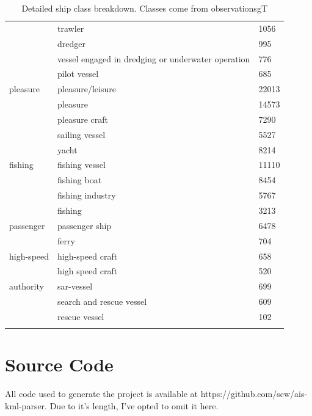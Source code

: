 \begin{longtable}{l|l|l}
          & trawler & 1056 \\
          & dredger & 995 \\
          & vessel engaged in dredging or underwater operation & 776 \\
          & pilot vessel & 685 \\
  pleasure & pleasure/leisure & 22013 \\
           & pleasure & 14573 \\
           & pleasure craft & 7290 \\
           & sailing vessel & 5527 \\
           & yacht & 8214 \\
  fishing & fishing vessel & 11110 \\
          & fishing boat & 8454 \\
          & fishing industry & 5767 \\
          & fishing & 3213 \\
  passenger & passenger ship & 6478 \\
            & ferry & 704 \\
  high-speed & high-speed craft & 658 \\
             & high speed craft & 520 \\
  authority & sar-vessel & 699 \\
            & search and rescue vessel & 609 \\
            & rescue vessel & 102 \\
  \caption{Detailed ship class breakdown. Classes come from observationsgT}
  \label{table:ship-class-breakdown}
\end{longtable}

\newpage
\section{Source Code}
\label{sec:source-code}


All code used to generate the project is available at https://github.com/scw/ais-kml-parser. Due to it's length, I've opted to omit it here.


